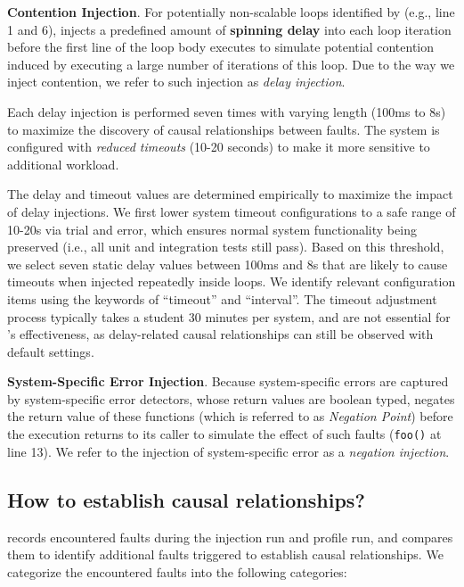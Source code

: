 \textbf{Contention Injection}. 
For potentially non-scalable loops 
identified by \tool (e.g., line 1 and 6), 
\tool 
injects a predefined amount of \textbf{spinning delay} 
into each loop iteration 
before the first line of the loop body executes 
to simulate potential contention induced 
by executing a large number of iterations of this loop. 
Due to the way we inject contention, 
we refer to such injection as \textit{delay injection}. 


Each delay injection is performed seven times with varying length (100ms to 8s) to maximize the discovery of causal relationships between faults. 
The system is configured with \textit{reduced timeouts} (10-20 seconds) to make it more sensitive to additional workload.


The delay and timeout values are determined empirically to maximize the impact of delay injections. We first lower system timeout configurations to a safe range of 10-20s via trial and error, which ensures normal system functionality being preserved (i.e., all unit and integration tests still pass).
Based on this threshold, we select seven static delay values between 100ms and 8s that are likely to cause timeouts when injected repeatedly inside loops. 
We identify relevant configuration items using the keywords of ``timeout'' and ``interval''. 
The timeout adjustment process typically takes a student 30 minutes per system, and are not essential for \tool's effectiveness, as delay-related causal relationships can still be observed with default settings.


\textbf{System-Specific Error Injection}. 
Because system-specific errors 
are captured by system-specific error detectors, 
whose return values are boolean typed, 
\tool negates the return value of these functions 
(which is referred to as \textit{Negation Point}) 
before the execution returns to its caller 
to simulate the effect of such faults 
(\texttt{foo()} at line 13). 
We refer to the injection of system-specific error as a \textit{negation injection}. 



\subsection{How to establish causal relationships?} 
\label{sec:fia:establish-causality}

\label{sec:fia:interference-analysis}

\tool records encountered faults during the injection run 
and profile run, 
and compares them to identify additional faults triggered 
to establish causal relationships. 
We categorize the encountered faults into the following categories: 

